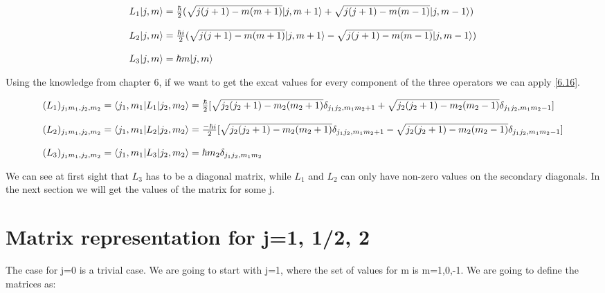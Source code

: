 \begin{equation*}
  \label{9.43}
  \begin{array}{l}
    L_1 \lvert j,m\rangle = \frac{\hbar}{2}(\sqrt{j(j+1) - m(m+1)}\lvert j,m+1\rangle + \sqrt{j(j+1) - m(m-1)}\lvert j,m-1\rangle)
    \\

    \\
    L_2 \lvert j,m\rangle = \frac{\hbar i}{2}(\sqrt{j(j+1) - m(m+1)}\lvert j,m+1\rangle - \sqrt{j(j+1) - m(m-1)}\lvert j,m-1\rangle)
    \\

    \\
    L_3 \lvert j,m\rangle = \hbar m \lvert j,m\rangle
  \end{array}
\end{equation*}

Using the knowledge from chapter 6, if we want to get the excat values for every component of the three operators we can apply \ref{6.16}.


\begin{equation*}
  \begin{array}{l}
    (L_1)_{j_1m_1,j_2,m_2} = \langle j_1,m_1\rvert L_1\lvert j_2,m_2\rangle = \frac{\hbar}{2}[\sqrt{j_2(j_2+1)-m_2(m_2+1)}\delta_{j_1j_2,m_1m_2+1} + \sqrt{j_2(j_2+1)-m_2(m_2-1)}\delta_{j_1j_2,m_1m_2-1}]
    \\

    \\
    (L_2)_{j_1m_1,j_2,m_2} = \langle j_1,m_1\rvert L_2\lvert j_2,m_2\rangle = \frac{-\hbar i}{2}[\sqrt{j_2(j_2+1)-m_2(m_2+1)}\delta_{j_1j_2,m_1m_2+1} - \sqrt{j_2(j_2+1)-m_2(m_2-1)}\delta_{j_1j_2,m_1m_2-1}]
    \\

    \\
    (L_3)_{j_1m_1,j_2,m_2} = \langle j_1,m_1\rvert L_3\lvert j_2,m_2\rangle = \hbar m_2 \delta_{j_1j_2,m_1m_2}
  \end{array}
\end{equation*}

We can see at first sight that $L_3$ has to be a diagonal matrix, while $L_1$ and $L_2$ can only have non-zero values on the secondary diagonals. In the next section we will get the values of the matrix for some j.

\section{Matrix representation for j={1, 1/2, 2}}


The case for j=0 is a trivial case. We are going to start with j=1, where the set of values for m is m={1,0,-1}. We are going to define the matrices as:

